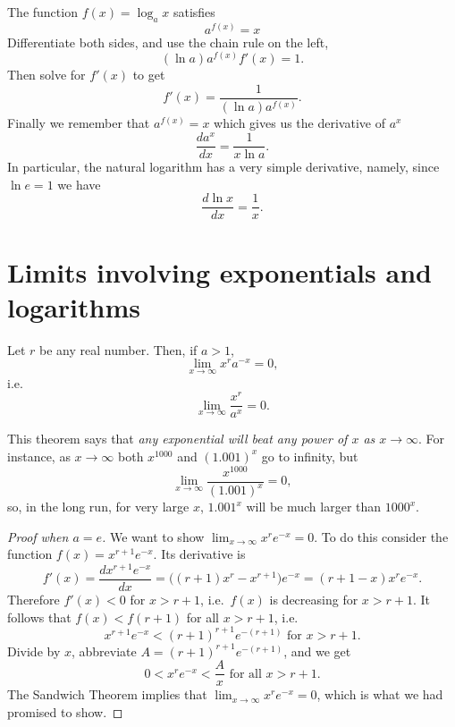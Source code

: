 The function $f(x)=\log_a x$ satisfies 
\[
a^{f(x)} = x 
\]
Differentiate both sides, and use the chain rule on the left,
\[
(\ln a)  a^{f(x)} f'(x) = 1.
\]
Then solve for $f'(x)$ to get
\[
f'(x) = \frac{1}{(\ln a) a^{f(x)}}. 
\]
Finally we remember that $a^{f(x)} = x$ which gives us the derivative of $a^x$
\[
\frac{da^x}{dx} = \frac{1}{x\ln a}.
\]
In particular, the natural logarithm has a very simple derivative, namely, since
$\ln e=1$ we have
\begin{equation}\label{eq:derivative-of-ln}
 \frac{d\ln x}{dx} = \frac{1}{x}.
\end{equation}


\section{Limits involving exponentials and logarithms}
\begin{theorem}  Let $r$ be any real number.  Then, if $a>1$, 
  \[
  \lim_{x\to\infty} x^r a^{-x} = 0,
  \]
  i.e.
  \[
  \lim_{x \to\infty}\frac{x^r}{a^x} = 0.
  \]
\end{theorem}
This theorem says that \textit{any exponential will beat any power of $x$ as
  $x\to\infty$}.  For instance, as $x \to\infty$ both $x^{1000}$ and $(1.001)^x$
go to infinity, but
\[
\lim_{x \to\infty} \frac{x^{1000}}{(1.001)^x} = 0,
\]
so, in the long run, for very large $x$, $1.001^x$ will be much larger than
$1000^x$.

\begin{proof}[Proof when $a=e$]
  We want to show $\lim_{x\to\infty} x^re^{-x} = 0$.  To do this consider the
  function $f(x) = x^{r+1}e^{-x}$.  Its derivative is
  \[
  f'(x) = \frac{dx^{r+1}e^{-x}}{dx}
  = \bigl((r+1)x^r - x^{r+1}\bigr)e^{-x}
  = (r+1-x)x^re^{-x}.
  \]
  Therefore $f'(x) < 0$ for $x>r+1$, i.e.\ $f(x)$ is decreasing for $x>r+1$.
  It follows that $f(x) <f(r+1)$ for all $x>r+1$, i.e.
  \[
  x^{r+1}e^{-x} < (r+1)^{r+1}e^{-(r+1)}\text{ for } x>r+1.
  \]
  Divide by $x$, abbreviate $A=(r+1)^{r+1}e^{-(r+1)}$, and we get
  \[
  0<x^re^{-x}<\frac Ax \text{ for all }x>r+1.
  \]
  The Sandwich Theorem implies that $\lim_{x\to\infty} x^re^{-x} = 0$, which
  is what we had promised to show.

\end{proof}

